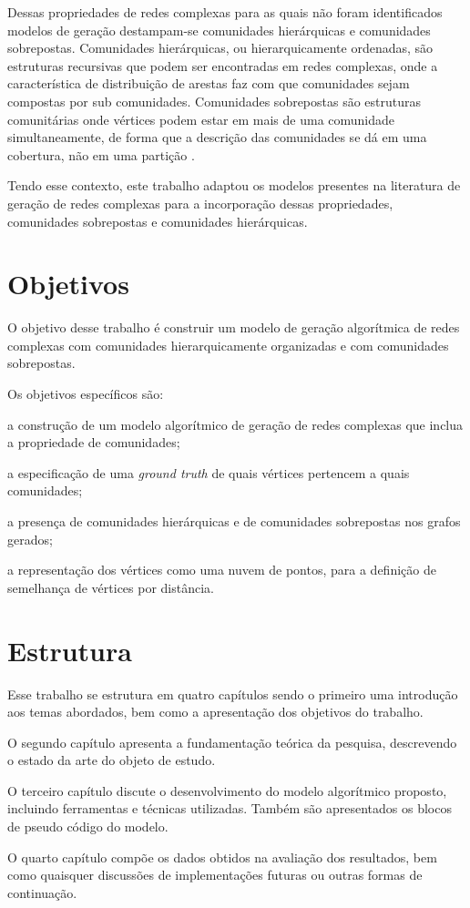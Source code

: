\documentclass[notes.tex]{subfiles}
\begin{document}
Dessas propriedades de redes complexas para as quais não foram identificados modelos de geração destampam-se comunidades hierárquicas e comunidades sobrepostas.
Comunidades hierárquicas, ou hierarquicamente ordenadas, são estruturas recursivas que podem ser encontradas em redes complexas, onde a característica de distribuição de arestas faz com que comunidades sejam compostas por sub comunidades.
Comunidades sobrepostas são estruturas comunitárias onde vértices podem estar em mais de uma comunidade simultaneamente, de forma que a descrição das comunidades se dá em uma cobertura, não em uma partição \cite{fortunato2010community}.

Tendo esse contexto, este trabalho adaptou os modelos presentes na literatura de geração de redes complexas para a incorporação dessas propriedades, comunidades sobrepostas e comunidades hierárquicas.

\section{Objetivos}

O objetivo desse trabalho é construir um modelo de geração algorítmica de redes complexas com comunidades hierarquicamente organizadas e com comunidades sobrepostas.

Os objetivos específicos são:

\begin{alineas}
    \item a construção de um modelo algorítmico de geração de redes complexas que inclua a propriedade de comunidades;
    \item a especificação de uma \emph{ground truth} de quais vértices pertencem a quais comunidades;
    \item a presença de comunidades hierárquicas e de comunidades sobrepostas nos grafos gerados;
    \item a representação dos vértices como uma nuvem de pontos, para a definição de semelhança de vértices por distância.
\end{alineas}

\section{Estrutura}

Esse trabalho se estrutura em quatro capítulos sendo o primeiro uma introdução aos temas abordados, bem como a apresentação dos objetivos do trabalho.

O segundo capítulo apresenta a fundamentação teórica da pesquisa, descrevendo o estado da arte do objeto de estudo.

O terceiro capítulo discute o desenvolvimento do modelo algorítmico proposto, incluindo ferramentas e técnicas utilizadas.
Também são apresentados os blocos de pseudo código do modelo.

O quarto capítulo compõe os dados obtidos na avaliação dos resultados, bem como quaisquer discussões de implementações futuras ou outras formas de continuação.
\end{document}
